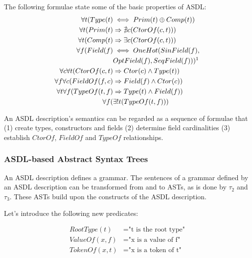 \noindent
The following formulae state some of the basic properties of ASDL:
 \begin{equation}
 \begin{split}
    \forall t(Type(t) &\iff Prim(t) \oplus Comp(t)) \\
    \forall t(Prim(t) &\Rightarrow \nexists c(CtorOf(c, t))) \\
    \forall t(Comp(t) &\Rightarrow \exists c(CtorOf(c, t))) \\
    \forall f(Field(f) &\iff OneHot(SinField(f),\\ 
    & OptField(f), SeqField(f))) \footnotemark \\
    \forall c \forall t(CtorOf(c, t) &\Rightarrow Ctor(c) \land Type(t)) \\
    \forall f \forall c(FieldOf(f, c) &\Rightarrow Field(f) \land Ctor(c)) \\
    \forall t \forall f(TypeOf(t, f) &\Rightarrow Type(t) \land Field(f)) \\
    \forall f(&\exists! t(TypeOf(t, f)))\\
 \end{split}
 \end{equation}

\noindent
An ASDL description's semantics can be regarded as a sequence of formulae that
(1) create types, constructors and fields (2) determine field cardinalities 
(3) establish \(CtorOf\), \(FieldOf\) and \(TypeOf\) relationships.

\subsubsection{ASDL-based Abstract Syntax Trees}

An ASDL description defines a grammar. The sentences of a grammar defined by
an ASDL description can be transformed from and to ASTs, as is done by
\(\tau_{2}\) and \(\tau_{3}\). These ASTs build upon the constructs of the
ASDL description.

\noindent
Let's introduce the following new predicates:

\begin{align*}
RootType(t)   &= \text{"t is the root type"} \\
ValueOf(x, f) &= \text{"x is a value of f"} \\
TokenOf(x, t) &= \text{"x is a token of t"}
\end{align*}

